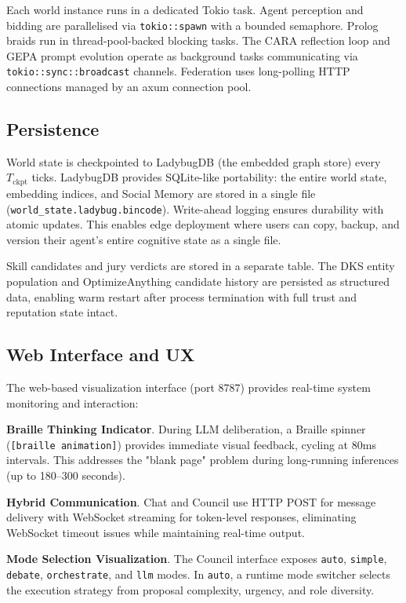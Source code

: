 \documentclass[11pt]{article}
\begin{document}
Each world instance runs in a dedicated Tokio task. Agent perception and bidding
are parallelised via \texttt{tokio::spawn} with a bounded semaphore. Prolog
braids run in thread-pool-backed blocking tasks. The CARA reflection loop and
GEPA prompt evolution operate as background tasks communicating via
\texttt{tokio::sync::broadcast} channels. Federation uses long-polling HTTP
connections managed by an axum connection pool.

\subsection{Persistence}

World state is checkpointed to LadybugDB (the embedded graph store) every
$T_{\text{ckpt}}$ ticks. LadybugDB provides SQLite-like portability: the entire
world state, embedding indices, and Social Memory are stored in a single file
(\texttt{world\_state.ladybug.bincode}). Write-ahead logging ensures durability
with atomic updates. This enables edge deployment where users can copy, backup,
and version their agent's entire cognitive state as a single file.

Skill candidates and jury verdicts are stored in a separate table. The DKS entity
population and OptimizeAnything candidate history are persisted as structured
data, enabling warm restart after process termination with full trust and
reputation state intact.

\subsection{Web Interface and UX}

The web-based visualization interface (port 8787) provides real-time system
monitoring and interaction:

\textbf{Braille Thinking Indicator}. During LLM deliberation, a Braille spinner
(\texttt{[braille animation]}) provides immediate visual feedback, cycling at 80ms
intervals. This addresses the "blank page" problem during long-running
inferences (up to 180--300 seconds).

\textbf{Hybrid Communication}. Chat and Council use HTTP POST for message
delivery with WebSocket streaming for token-level responses, eliminating
WebSocket timeout issues while maintaining real-time output.

\textbf{Mode Selection Visualization}. The Council interface exposes
\texttt{auto}, \texttt{simple}, \texttt{debate}, \texttt{orchestrate}, and
\texttt{llm} modes. In \texttt{auto}, a runtime mode switcher selects the
execution strategy from proposal complexity, urgency, and role diversity.
\end{document}
